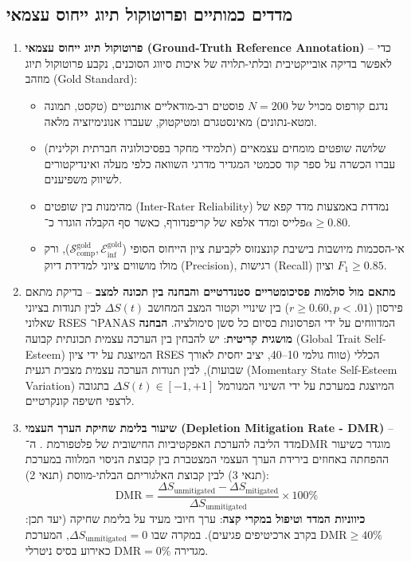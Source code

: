 \subsection{מדדים כמותיים ופרוטוקול תיוג ייחוס עצמאי}
\begin{enumerate}
    \item \textbf{פרוטוקול תיוג ייחוס עצמאי (\textenglish{Ground-Truth Reference Annotation})} --
    כדי לאפשר בדיקה אובייקטיבית ובלתי-תלויה של איכות סיווג הסוכנים, נקבע פרוטוקול תיוג מוזהב (\textenglish{Gold Standard}):
    \begin{itemize}
        \item נדגם קורפוס מכויל של $N = 200$ פוסטים רב-מודאליים אותנטיים (טקסט, תמונה ומטא-נתונים) מאינסטגרם ומטיקטוק, שעברו אנונימיזציה מלאה.
        \item שלושה שופטים מומחים עצמאיים (תלמידי מחקר בפסיכולוגיה חברתית וקלינית) עברו הכשרה על ספר קוד סכמטי המגדיר מדרגי השוואה כלפי מעלה ואינדיקטורים לשיווק משפיענים.
        \item מהימנות בין שופטים (\textenglish{Inter-Rater Reliability}) נמדדת באמצעות מדד קפא של פלייס ומדד אלפא של קריפנדורף, כאשר סף הקבלה הוגדר כ־$\alpha \ge 0.80$.
        \item אי-הסכמות מיושבות בישיבת קונצנזוס לקביעת ציון הייחוס הסופי ($\mathcal{S}_{\text{comp}}^{\text{gold}}, \mathcal{E}_{\text{inf}}^{\text{gold}}$), ורק מולו מושווים ציוני \agentAnalyst{} למדידת דיוק (\textenglish{Precision}), רגישות (\textenglish{Recall}) וציון $F_1 \ge 0.85$.
    \end{itemize}
    
    \item \textbf{מתאם מול סולמות פסיכומטריים סטנדרטיים והבחנה בין תכונה למצב} --
    בדיקת מתאם פירסון ($r \ge 0.60, p < .01$) בין שינויי וקטור המצב המחושב $\Delta S(t)$ לבין תנודות בציוני שאלוני \textenglish{RSES} ו־\textenglish{PANAS} המדווחים על ידי הפרסונות בסיום כל סשן סימולציה.
    \newline \textbf{הבחנה מושגית קריטית}: יש להבחין בין הערכה עצמית תכונתית קבועה (\textenglish{Global Trait Self-Esteem}) המיוצגת על ידי ציון \textenglish{RSES} הכללי (טווח גולמי 10--40, יציב יחסית לאורך שבועות), לבין תנודות הערכה עצמית מצבית רגעית (\textenglish{Momentary State Self-Esteem Variation}) המיוצגת במערכת על ידי השינוי המנורמל $\Delta S(t) \in [-1, +1]$ בתגובה לרצפי חשיפה קונקרטיים.

    \item \textbf{שיעור בלימת שחיקת הערך העצמי (\textenglish{Depletion Mitigation Rate - DMR})} --
    מדד הליבה להערכת האפקטיביות החישובית של פלטפורמת \projectname{}. ה־\textenglish{DMR} מוגדר כשיעור ההפחתה באחוזים בירידת הערך העצמי המצטברת בין קבוצת הניסוי המלווה במערכת (תנאי 3) לבין קבוצת האלגוריתם הבלתי-מווסת (תנאי 2):
    \begin{equation}
        \text{DMR} = \frac{\Delta S_{\text{unmitigated}} - \Delta S_{\text{mitigated}}}{\Delta S_{\text{unmitigated}}} \times 100\%
    \end{equation}
    \textbf{כיווניות המדד וטיפול במקרי קצה}: ערך חיובי מעיד על בלימת שחיקה (יעד תכן: $\text{DMR} \ge 40\%$ בקרב ארכיטיפים פגיעים). במקרה שבו $\Delta S_{\text{unmitigated}} = 0$, המערכת מגדירה $\text{DMR} = 0\%$ כאירוע בסיס ניטרלי.
\end{enumerate}

